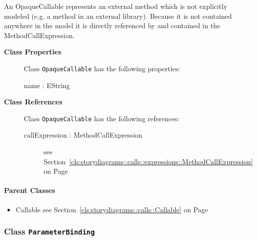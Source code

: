 An OpaqueCallable represents an external method which is not explicitly modeled (e.g. a method in an external library). Because it is not contained anywhere in the model it is directly referenced by and contained in the MethodCallExpression.	
			
	
		
	


\begin{description}

	\item[\textbf{Class Properties}] Class \texttt{OpaqueCallable} has the following properties:
	\begin{description}
\item[name : EString 	]

\hspace{\fill}
\nopagebreak


	
	\end{description}
	
	\item[\textbf{Class References}] Class \texttt{OpaqueCallable} has the following references:
	\begin{description}
\item[callExpression : MethodCallExpression 	]
see Section~\ref{cls:storydiagrams::calls::expressions::MethodCallExpression} on Page~\pageref{cls:storydiagrams::calls::expressions::MethodCallExpression}
\hspace{\fill}
\nopagebreak


	
	\end{description}
	

\end{description}

\paragraph{Parent Classes}
\begin{itemize}
\item Callable see Section~\ref{cls:storydiagrams::calls::Callable} on Page~\pageref{cls:storydiagrams::calls::Callable}\end{itemize}
\subsubsection{\Large{Class \bfseries \texttt{ParameterBinding}\normalfont}}
\label{cls:storydiagrams::calls::ParameterBinding} 
